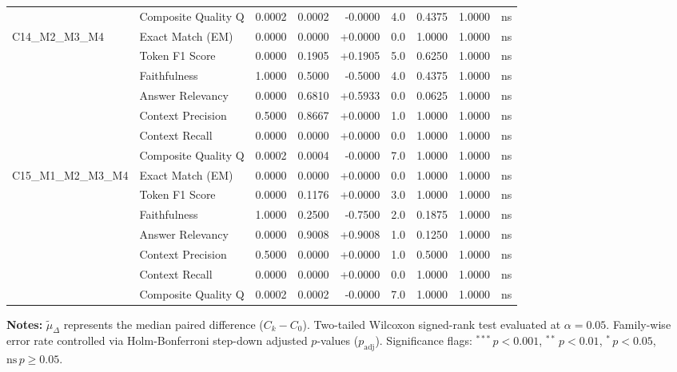 \begin{table}[p]
\begin{tabular*}{\textwidth}{@{\extracolsep{\fill}} l l r r r r r r c @{}}
                & Composite Quality Q  & 0.0002 & 0.0002 & -0.0000 & 4.0 & 0.4375 & 1.0000 & ns \\
\addlinespace
C14\_M2\_M3\_M4 & Exact Match (EM)     & 0.0000 & 0.0000 & +0.0000 & 0.0 & 1.0000 & 1.0000 & ns \\
                & Token F1 Score       & 0.0000 & 0.1905 & +0.1905 & 5.0 & 0.6250 & 1.0000 & ns \\
                & Faithfulness         & 1.0000 & 0.5000 & -0.5000 & 4.0 & 0.4375 & 1.0000 & ns \\
                & Answer Relevancy     & 0.0000 & 0.6810 & +0.5933 & 0.0 & 0.0625 & 1.0000 & ns \\
                & Context Precision    & 0.5000 & 0.8667 & +0.0000 & 1.0 & 1.0000 & 1.0000 & ns \\
                & Context Recall       & 0.0000 & 0.0000 & +0.0000 & 0.0 & 1.0000 & 1.0000 & ns \\
                & Composite Quality Q  & 0.0002 & 0.0004 & -0.0000 & 7.0 & 1.0000 & 1.0000 & ns \\
\addlinespace
C15\_M1\_M2\_M3\_M4 & Exact Match (EM)     & 0.0000 & 0.0000 & +0.0000 & 0.0 & 1.0000 & 1.0000 & ns \\
                & Token F1 Score       & 0.0000 & 0.1176 & +0.0000 & 3.0 & 1.0000 & 1.0000 & ns \\
                & Faithfulness         & 1.0000 & 0.2500 & -0.7500 & 2.0 & 0.1875 & 1.0000 & ns \\
                & Answer Relevancy     & 0.0000 & 0.9008 & +0.9008 & 1.0 & 0.1250 & 1.0000 & ns \\
                & Context Precision    & 0.5000 & 0.0000 & +0.0000 & 1.0 & 0.5000 & 1.0000 & ns \\
                & Context Recall       & 0.0000 & 0.0000 & +0.0000 & 0.0 & 1.0000 & 1.0000 & ns \\
                & Composite Quality Q  & 0.0002 & 0.0002 & -0.0000 & 7.0 & 1.0000 & 1.0000 & ns \\
\bottomrule
\end{tabular*}
\vspace{0.5em}
\parbox{\textwidth}{\footnotesize
\textbf{Notes:} $\tilde{\mu}_\Delta$ represents the median paired difference ($C_k - C_0$). Two-tailed Wilcoxon signed-rank test evaluated at $\alpha = 0.05$. Family-wise error rate controlled via Holm-Bonferroni step-down adjusted $p$-values ($p_{\text{adj}}$). Significance flags: $^{***}\,p < 0.001$, $^{**}\,p < 0.01$, $^{*}\,p < 0.05$, $\text{ns}\,p \ge 0.05$.}
\end{table}
